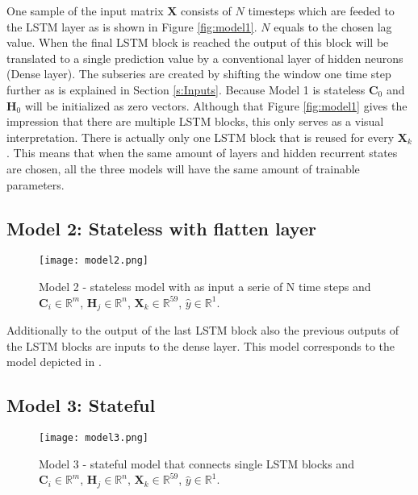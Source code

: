 One sample of the input matrix $ \bm{X} $ consists of $ N $ timesteps which are feeded to the LSTM layer as is shown in Figure \ref{fig:model1}. $ N $ equals to the chosen lag value. When the final LSTM block is reached the output of this block will be translated to a single prediction value by a conventional layer of hidden neurons (Dense layer). The subseries are created by shifting the window one time step further as is explained in Section \ref{s:Inputs}. Because Model 1 is stateless $ \bm{C}_{0} $ and $ \bm{H}_{0} $ will be initialized as zero vectors. Although that Figure \ref{fig:model1} gives the impression that there are multiple LSTM blocks, this only serves as a visual interpretation. There is actually only one LSTM block that is reused for every $ \bm{X}_{k} $. This means that when the same amount of layers and hidden recurrent states are chosen, all the three models will have the same amount of trainable parameters. 


\subsection{Model 2: Stateless with flatten layer}\label{s:Model2}

\begin{figure}[ht]
	\centering
	\texttt{[image: model2.png]}
	\caption{Model 2 - stateless model with as input a serie of N time steps and $ \bm{C}_{i} \in \mathbb{R}^{m} $, $ \bm{H}_{j} \in \mathbb{R}^{n} $, $ \bm{X}_{k} \in \mathbb{R}^{59} $, $ \hat{y} \in \mathbb{R}^{1} $.}
	\label{fig:model2}
\end{figure}

Additionally to the output of the last LSTM block also the previous outputs of the LSTM blocks are inputs to the dense layer. This model corresponds to the model depicted in \cite{Kong2019}.

\subsection{Model 3: Stateful}\label{s:Model3}
\begin{figure}[ht]
	\centering
	\texttt{[image: model3.png]}
	\caption{Model 3 - stateful model that connects single LSTM blocks and $ \bm{C}_{i} \in \mathbb{R}^{m} $, $ \bm{H}_{j} \in \mathbb{R}^{n} $, $ \bm{X}_{k} \in \mathbb{R}^{59} $, $ \hat{y} \in \mathbb{R}^{1} $.}
	\label{fig:model3}
\end{figure}

